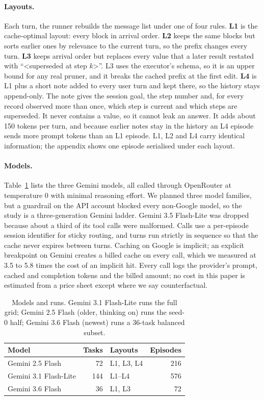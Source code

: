 \paragraph{Layouts.} Each turn, the runner rebuilds the message list under one of four rules. \textbf{L1} is the cache-optimal layout: every block in arrival order. \textbf{L2} keeps the same blocks but sorts earlier ones by relevance to the current turn, so the prefix changes every turn. \textbf{L3} keeps arrival order but replaces every value that a later result restated with ``\textless superseded at step $k$\textgreater''. L3 uses the executor's schema, so it is an upper bound for any real pruner, and it breaks the cached prefix at the first edit. \textbf{L4} is L1 plus a short note added to every user turn and kept there, so the history stays append-only. The note gives the session goal, the step number and, for every record observed more than once, which step is current and which steps are superseded. It never contains a value, so it cannot leak an answer. It adds about 150 tokens per turn, and because earlier notes stay in the history an L4 episode sends more prompt tokens than an L1 episode. L1, L2 and L4 carry identical information; the appendix shows one episode serialised under each layout.

\paragraph{Models.} Table~\ref{tab:models} lists the three Gemini models, all called through OpenRouter at temperature 0 with minimal reasoning effort. We planned three model families, but a guardrail on the API account blocked every non-Google model, so the study is a three-generation Gemini ladder. Gemini 3.5 Flash-Lite was dropped because about a third of its tool calls were malformed. Calls use a per-episode session identifier for sticky routing, and turns run strictly in sequence so that the cache never expires between turns. Caching on Google is implicit; an explicit breakpoint on Gemini creates a billed cache on every call, which we measured at 3.5 to 5.8 times the cost of an implicit hit. Every call logs the provider's prompt, cached and completion tokens and the billed amount; no cost in this paper is estimated from a price sheet except where we say counterfactual.

\begin{table}[t]
\centering\small
\setlength{\tabcolsep}{4pt}
\begin{tabular}{@{}lrlr@{}}
\toprule
Model & Tasks & Layouts & Episodes \\
\midrule
Gemini 2.5 Flash & 72 & L1, L3, L4 & 216 \\
Gemini 3.1 Flash-Lite & 144 & L1--L4 & 576 \\
Gemini 3.6 Flash & 36 & L1, L3 & 72 \\
\bottomrule
\end{tabular}
\caption{Models and runs. Gemini 3.1 Flash-Lite runs the full grid; Gemini 2.5 Flash (older, thinking on) runs the seed-0 half; Gemini 3.6 Flash (newest) runs a 36-task balanced subset.}
\label{tab:models}
\end{table}

